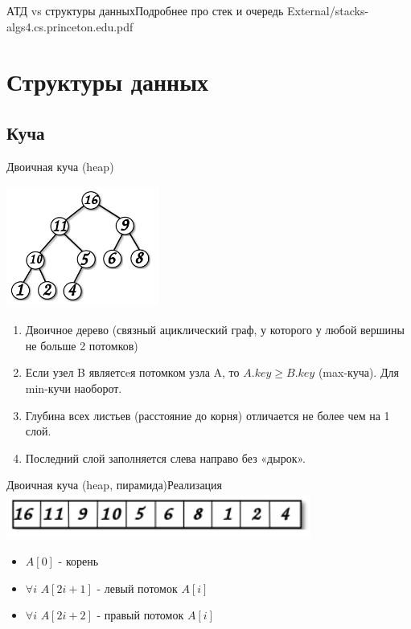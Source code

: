 \documentclass[10pt]{beamer}
\begin{document}
\begin{frame}[fragile]{АТД vs структуры данных}{Подробнее про стек и очередь}
External/stacks-algs4.cs.princeton.edu.pdf
\end{frame}

\section{Структуры данных}
\subsection{Куча}
\begin{frame}[fragile]{Двоичная куча (heap)}
\begin{multicols}{2}
\includegraphics[width=5cm, height=4cm]{Term_1/Source/Pirctures/max-heap2.png}
\vfill\eject
\begin{enumerate}
    \item Двоичное дерево (связный ациклический граф, у которого у любой вершины не больше 2 потомков)
    \item Если узел B являетсeя потомком узла A, то $A.key \geq B.key$ (max-куча). Для min-кучи наоборот.
    \item Глубина всех листьев (расстояние до корня) отличается не более чем на 1 слой.
    \item Последний слой заполняется слева направо без «дырок».
\end{enumerate}
\end{multicols}
\end{frame}

\begin{frame}[fragile]{Двоичная куча (heap, пирамида)}{Реализация}
\includegraphics[width=10cm, height=1.5cm]{Term_1/Source/Pirctures/max-heap-array.png}\\
\begin{itemize}
    \item $A[0]$ - корень\\
    \item $\forall i$ $A[2i+1]$ - левый потомок $A[i]$\\
    \item $\forall i$ $A[2i+2]$ - правый потомок $A[i]$
\end{itemize}
\end{frame}
\end{document}
